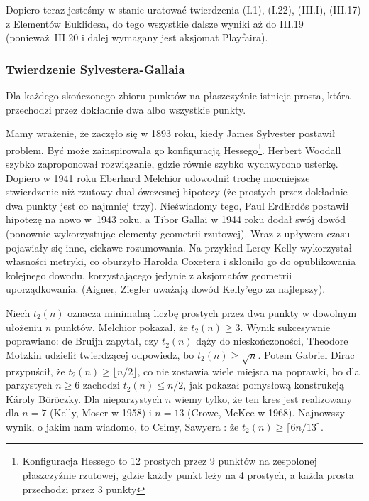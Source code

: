Dopiero teraz jesteśmy w stanie uratować twierdzenia (I.1), (I.22), (III.I), (III.17) z Elementów Euklidesa, do tego wszystkie dalsze wyniki aż do III.19 (ponieważ III.20 i dalej wymagany jest aksjomat Playfaira).


\subsubsection{Twierdzenie Sylvestera-Gallaia}
\begin{theorem}
	Dla każdego skończonego zbioru punktów na płaszczyźnie istnieje prosta, która przechodzi przez dokładnie dwa albo wszystkie punkty.
\end{theorem}

Mamy wrażenie, że zaczęło się w 1893 roku, kiedy James Sylvester postawił problem.
Być może zainspirowała go konfiguracją Hessego\footnote{Konfiguracja Hessego to 12 prostych przez 9 punktów na zespolonej płaszczyźnie rzutowej, gdzie każdy punkt leży na 4 prostych, a każda prosta przechodzi przez 3 punkty}.
Herbert Woodall szybko zaproponował rozwiązanie, gdzie równie szybko wychwycono usterkę.
Dopiero w 1941 roku Eberhard Melchior udowodnił trochę mocniejsze stwierdzenie niż rzutowy dual ówczesnej hipotezy (że prostych przez dokładnie dwa punkty jest co najmniej trzy).
Nieświadomy tego, Paul ErdErdős postawił hipotezę na nowo w~1943 roku, a Tibor Gallai w 1944 roku dodał swój dowód (ponownie wykorzystując elementy geometrii rzutowej).
Wraz z upływem czasu pojawiały się inne, ciekawe rozumowania.
Na przykład Leroy Kelly wykorzystał własności metryki, co oburzyło Harolda Coxetera i skłoniło go do opublikowania kolejnego dowodu, korzystającego jedynie z aksjomatów geometrii uporządkowania.
(Aigner, Ziegler uważają dowód Kelly'ego za najlepszy).

Niech $t_2(n)$ oznacza minimalną liczbę prostych przez dwa punkty w dowolnym ułożeniu $n$ punktów.
Melchior pokazał, że $t_2(n) \ge 3$.
Wynik sukcesywnie poprawiano:
de Bruijn \cite{debruijn_1948} zapytał, czy $t_2(n)$ dąży do nieskończoności,
Theodore Motzkin \cite{motzkin_1951} udzielił twierdzącej odpowiedz, bo $t_2(n) \ge \sqrt{n}$.
Potem Gabriel Dirac \cite{dirac_1951} przypuścił, że $t_2(n) \ge \lfloor n/2\rfloor$, co nie zostawia wiele miejsca na poprawki, bo dla parzystych $n \ge 6$ zachodzi $t_2(n) \le n/2$, jak pokazał pomysłową konstrukcją Károly Böröczky.
Dla nieparzystych $n$ wiemy tylko, że ten kres jest realizowany dla $n = 7$ (Kelly, Moser \cite{kelly_1958} w 1958) i $n = 13$ (Crowe, McKee \cite{mckee_1968} w 1968).
Najnowszy wynik, o jakim nam wiadomo, to Csimy, Sawyera \cite{csima_1993}: że $t_2(n) \ge \lceil 6n/13 \rceil$.